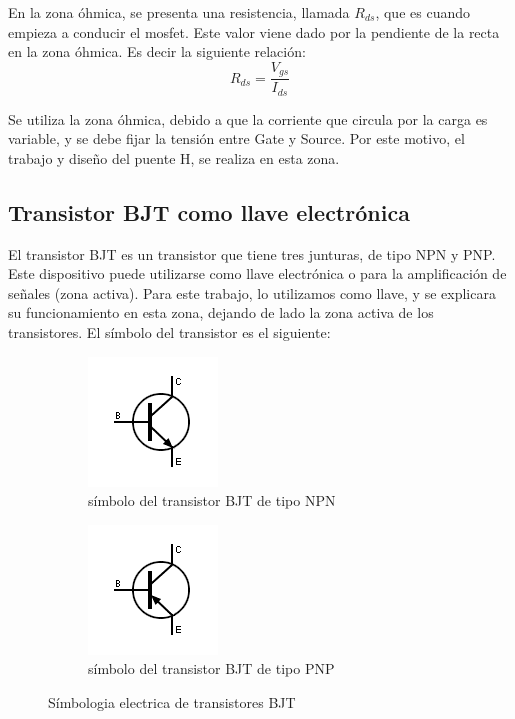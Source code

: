 En la zona óhmica, se presenta una resistencia, llamada $R_{ds}$, que es cuando empieza a conducir el mosfet. Este valor viene dado por la pendiente de la recta en la zona óhmica. Es decir la siguiente relación: 
\begin{equation*}
	R_{ds} =\frac {V_{gs}}{I_{ds}} 
\end{equation*}

Se utiliza la zona óhmica, debido a que la corriente que circula por la carga es variable, y se debe fijar la tensión entre Gate y Source. Por este motivo, el trabajo y diseño del puente H, se realiza en esta zona. 

\subsection{Transistor BJT como llave electrónica}

El transistor BJT es un transistor que tiene tres junturas, de tipo NPN y PNP. Este dispositivo puede utilizarse como llave electrónica o para la amplificación de señales (zona activa). Para este trabajo, lo utilizamos como llave, y se explicara su funcionamiento en esta zona, dejando de lado la zona activa de los transistores. El símbolo del transistor es el siguiente: 
\vspace{-5mm}
\begin{figure}[h]
	\begin{subfigure}{0.5\textwidth}
		\includegraphics{simbol_npn}
		\caption{símbolo del transistor BJT de tipo NPN }
	\end{subfigure}
	\hfill 
	\begin{subfigure}[h]{0.5\textwidth}
		\includegraphics{simbol_pnp}
		\caption{símbolo del transistor BJT de tipo PNP }
	\end{subfigure} 
\caption{Símbologia electrica de transistores BJT} 
\end{figure}
\vspace{-5mm}

